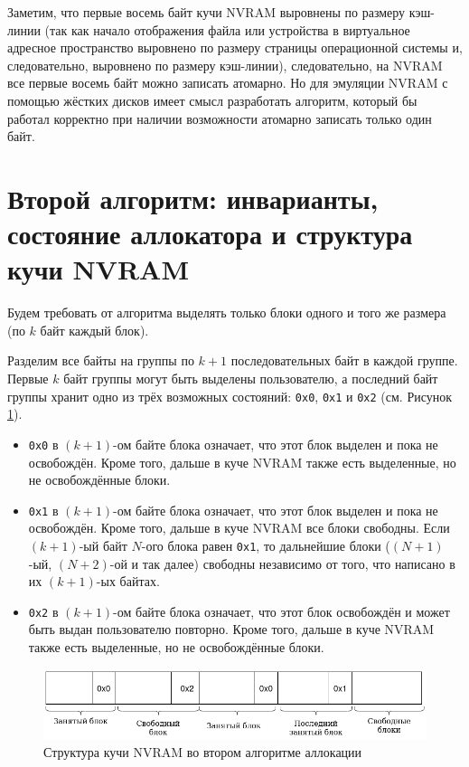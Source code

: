 \documentclass[times,specification,annotation]{itmo-student-thesis}
\begin{document}
Заметим, что первые восемь байт кучи NVRAM выровнены по размеру кэш-линии (так как начало отображения файла или устройства в виртуальное адресное пространство выровнено по размеру страницы операционной системы \cite{mmap} и, следовательно, выровнено по размеру кэш-линии), следовательно, на NVRAM все первые восемь байт можно записать атомарно. Но для эмуляции NVRAM с помощью жёстких дисков имеет смысл разработать алгоритм, который бы работал корректно при наличии возможности атомарно записать только один байт.

\section{Второй алгоритм: инварианты, состояние аллокатора и структура кучи NVRAM}

Будем требовать от алгоритма выделять только блоки одного и того же размера (по $k$ байт каждый блок).

Разделим все байты на группы по $k + 1$ последовательных байт в каждой группе. Первые $k$ байт группы могут быть выделены пользователю, а последний байт группы хранит одно из трёх возможных состояний: \texttt{0x0}, \texttt{0x1} и \texttt{0x2} (см. Рисунок \ref{heap-structure-second-algo-pic}).

\begin{itemize}
    \item \texttt{0x0} в $(k + 1)$-ом байте блока означает, что этот блок выделен и пока не освобождён. Кроме того, дальше в куче NVRAM также есть выделенные, но не освобождённые блоки.
    
    \item \texttt{0x1} в $(k + 1)$-ом байте блока означает, что этот блок выделен и пока не освобождён. Кроме того, дальше в куче NVRAM все блоки свободны. Если $(k + 1)$-ый байт $N$-ого блока равен \texttt{0x1}, то дальнейшие блоки ($(N + 1)$-ый, $(N + 2)$-ой и так далее) свободны независимо от того, что написано в их $(k + 1)$-ых байтах.
    
    \item \texttt{0x2} в $(k + 1)$-ом байте блока означает, что этот блок освобождён и может быть выдан пользователю повторно. Кроме того, дальше в куче NVRAM также есть выделенные, но не освобождённые блоки.
\end{itemize}

\bigbreak

\begin{figure}[H]
  \centering
  \caption{Структура кучи NVRAM во втором алгоритме аллокации}
  \label{heap-structure-second-algo-pic}
  \includegraphics[width=\linewidth]{block_structure.png}
\end{figure}
\end{document}

